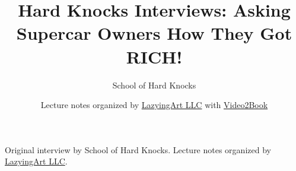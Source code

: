 \documentclass[11pt,oneside]{book}
\begin{document}
\frontmatter
\title{Hard Knocks Interviews: Asking Supercar Owners How They Got RICH!}
\author{School of Hard Knocks}
\date{Lecture notes organized by \href{https://lazying.art}{LazyingArt LLC} with \href{https://github.com/lachlanchen/Video2Book}{Video2Book}}
\maketitle
\begin{center}
\small Original interview by School of Hard Knocks. Lecture notes organized by \href{https://lazying.art}{LazyingArt LLC}.
\end{center}
\clearpage
\mainmatter

\end{document}
